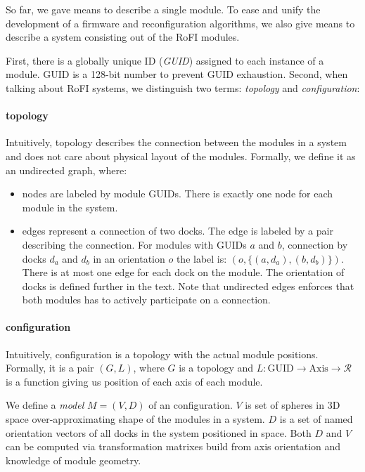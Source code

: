So far, we gave means to describe a single module. To ease and unify the
development of a firmware and reconfiguration algorithms, we also give means to
describe a system consisting out of the RoFI modules.

First, there is a globally unique ID (\emph{GUID}) assigned to each instance of
a module. GUID is a 128-bit number to prevent GUID exhaustion. Second, when
talking about RoFI systems, we distinguish two terms: \emph{topology} and
\emph{configuration}:

\paragraph{topology} Intuitively, topology describes the connection between the
modules in a system and does not care about physical layout of the modules.
Formally, we define it as an undirected graph, where:
\begin{itemize}
    \item nodes are labeled by module GUIDs. There is exactly one node for each
    module in the system.
    \item edges represent a connection of two docks. The edge is labeled by a
    pair describing the connection. For modules with GUIDs $a$ and $b$,
    connection by docks $d_a$ and $d_b$ in an orientation $o$ the label is: $(o,
    \{(a, d_a), (b, d_b)\})$. There is at most one edge for each dock on the
    module. The orientation of docks is defined further in the text. Note that
    undirected edges enforces that both modules has to actively participate on a
    connection.
\end{itemize}

\paragraph{configuration} Intuitively, configuration is a topology with the
actual module positions. Formally, it is a pair $(G, L)$, where $G$ is a
topology and $L: \text{GUID} \rightarrow \text{Axis} \rightarrow \mathcal{R}$ is
a function giving us position of each axis of each module.

We define a \emph{model} $M = (V, D)$ of an configuration. $V$ is set of spheres
in 3D space over-approximating shape of the modules in a system. $D$ is a set of
named orientation vectors of all docks in the system positioned in space. Both
$D$ and $V$ can be computed via transformation matrixes build from axis
orientation and knowledge of module geometry.

